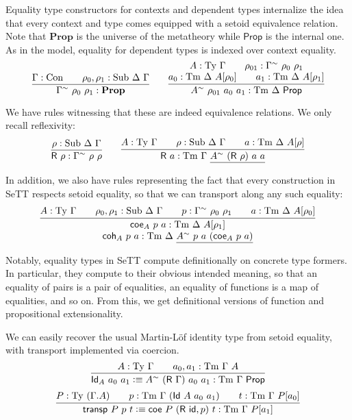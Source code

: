 \documentclass[autoref]{llncs}
\newcommand{\GG}{\Gamma}
\newcommand{\DD}{\Delta}
\newcommand{\GD}{\Delta}
\newcommand{\R}{\textsf{R}}
\newcommand{\Id}{\textsf{Id}}
\newcommand{\coe}{\textsf{coe}}
\newcommand{\coh}{\textsf{coh}}
\newcommand{\tyj}[2]{#2 : \Ty\ #1}
\newcommand{\tmj}[3]{#2 : \Tm\ #1\ #3}
\newcommand{\subj}[3]{#1 : \mathrm{Sub}\ #2\ #3}
\newcommand{\Prop}{\textsf{Prop}}
\newcommand{\mProp}{\mathbf{Prop}}
\newcommand{\Con}{\mathrm{Con}}
\newcommand{\Ty}{\mathrm{Ty}}
\newcommand{\Tm}{\mathrm{Tm}}
\newcommand{\Sub}{\mathrm{Sub}}
\newcommand{\defeq}{\mathrel{\vcentcolon\equiv}}
\begin{document}
Equality type constructors for contexts and dependent types internalize the idea
that every context and type comes equipped with a setoid equivalence
relation. Note that $\mProp$ is the universe of the metatheory while $\Prop$ is
the internal one. As in the model, equality for dependent types is indexed over context
equality.
{\small\[
\infer{
  \GG^\sim\ \rho_0\ \rho_1 : \mProp
}{
  \GG : \Con \qquad \subj{\rho_0, \rho_1}{\DD}{\GG}
}
\qquad
\infer{
  A^{\sim}\ \rho_{01}\ a_0\ a_1 : \Tm\ \DD\ \Prop
}{
  \deduce{
    a_0 : \Tm\ \DD\ A[\rho_0] \qquad a_1 : \Tm\ \DD\ A[\rho_1]
  }{
    A : \Ty\ \GG \qquad \rho_{01} : \GG^{\sim}\ \rho_0\ \rho_1
  }
}
\]}\vspace{-1em}

We have rules witnessing that these are indeed equivalence relations. We only
recall reflexivity:
{\small\[
\infer{
  \textsf{R}\ \rho : \GG^\sim\ \rho\ \rho
}{
  \rho : \Sub\ \GD\ \GG
}
\qquad
\infer{
  \textsf{R}\ a : \Tm\ \GG\ \underline{A^\sim\ (\textsf{R}\ \rho)\ a\ a}
}{
  A : \Ty\ \GG
  \qquad
  \rho : \Sub\ \GD\ \GG
  \qquad
  a : \Tm\ \GD\ A[\rho]
}
\]}\vspace{-1em}

In addition, we also have rules representing the fact that every construction in
SeTT respects setoid equality, so that we can transport along any such
equality:
{\small
    \[
    \infer{
      \deduce{
        \tmj{\GD}{\coh_A\ p\ a}{\underline{A^\sim\ p\ a\ (\coe_A\ p\ a)}}
      }{
        \tmj{\GD}{\coe_A\ p\ a}{A[\rho_1]}
      }
    }{
      \tyj{\GG}{A} \qquad \subj{\rho_0, \rho_1}{\GD}{\GG} \qquad
      p : \GG^\sim\ \rho_0\ \rho_1\qquad
      \tmj{\GD}{a}{A[\rho_0]}
    }
    \]}\vspace{-1em}

Notably, equality types in SeTT compute definitionally on concrete type
formers. In particular, they compute to their obvious intended meaning, so that
an equality of pairs is a pair of equalities, an equality of functions is a map
of equalities, and so on. From this, we get definitional versions of function
and propositional extensionality.

We can easily recover the usual Martin-L\"of identity type from setoid equality,
with transport implemented via coercion.
{\small\[
\infer{
  \textsf{Id}_A\ a_0\ a_1 \defeq A^{\sim}\ (\R\ \GG)\ a_0\ a_1 : \Tm\ \GG\ \Prop
}{
  \tyj{\GG}{A} \qquad \tmj{\GG}{a_0, a_1}{A}
}
\]
\[
\infer{
  \textsf{transp}\ P\ p\ t \defeq
    \coe\ P\ (\textsf{R}\ \textsf{id} , p)\ t : \Tm\ \GG\ P[a_1]
}{
  P : \Ty\ (\GG . A)
  \qquad
  p : \Tm\ \GG\ (\Id\ A\ a_0\ a_1)
  \qquad
  t : \Tm\ \GG\ P[a_0]
}
\]}\vspace{-1em}
\end{document}
